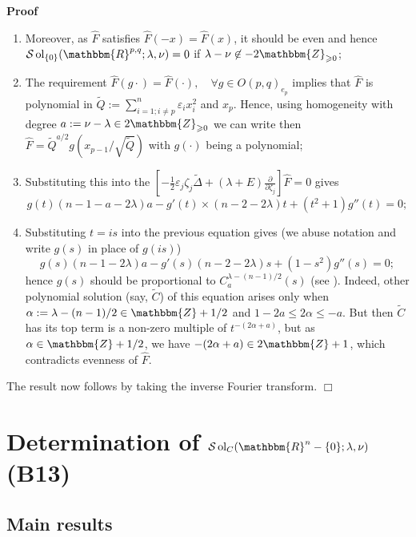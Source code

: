 \documentclass{article}
\newcommand{\assign}{:=}
\newcommand{\nin}{\not\in}
\newcommand{\tmop}[1]{\ensuremath{\operatorname{#1}}}
\renewenvironment{proof}{\noindent\textbf{Proof\ }}{\hspace*{\fill}$\Box$\medskip}
\theoremstyle{remark}
\begin{document}
\begin{proof}
\begin{enumerate}
    \item Moreover, as $\hat{F}$ satisfies $\hat{F} (- x) = \hat{F} (x)$, it
    should be even and hence $\mathcal{S} \tmop{ol}_{\{ 0 \}} (\mathbbm{R}^{p,
    q} ; \lambda, \nu) = 0$ if $\lambda - \nu \nin - 2\mathbbm{Z}_{\geqslant
    0}$;
    
    \item The requirement $\hat{F} (g \cdot) = \hat{F} (\cdot), \quad \forall
    g \in O (p, q)_{e_p}$ implies that $\hat{F}$ is polynomial in $\tilde{Q}
    \assign \sum_{i = 1 ; i \neq p}^n \varepsilon_i x_i^2$ and $x_p$. Hence,
    using homogeneity with degree $a \assign \nu - \lambda \in
    2\mathbbm{Z}_{\geqslant 0}$ we can write then $\hat{F} = \tilde{Q}^{a / 2}
    g \left( x_{p - 1} / \sqrt{\tilde{Q}} \right)$ with $g (\cdot)$ being a
    polynomial;
    
    \item Substituting this into the $\left[ - \frac{1}{2} \varepsilon_j
    \zeta_j \tilde{\Delta} + (\lambda + E) \frac{\partial}{\partial \zeta_j}
    \right] \hat{F} = 0$ gives
    \[ g (t) (n - 1 - a - 2 \lambda) a - g' (t) \times (n - 2 - 2 \lambda) t
       + (t^2 + 1) g'' (t) = 0 ; \]
    \item Substituting $t = i s$ into the previous equation gives (we abuse
    notation and write $g (s)$ in place of $g (i s)$)
    \[ g (s) (n - 1 - 2 \lambda) a - g' (s) (n - 2 - 2 \lambda) s + (1 - s^2)
       g'' (s) = 0 ; \]
    hence $g (s)$ should be proportional to $C^{\lambda - (n - 1) / 2}_a (s)$
    (see {\cite[thm. 11.4]{kobayashi2015differential2}}). Indeed, other
    polynomial solution (say, $\tilde{C}$) of this equation arises only when
    $\alpha \assign \lambda - (n - 1) / 2 \in \mathbbm{Z}+ 1 / 2$ and $1 - 2 a
    \leqslant 2 \alpha \leqslant - a$. But then $\tilde{C}$ has its top term
    is a non-zero multiple of $t^{- (2 \alpha + a)}$, but as $\alpha \in
    \mathbbm{Z}+ 1 / 2$, we have $- (2 \alpha + a) \in 2\mathbbm{Z}+ 1$, which
    contradicts evenness of $\hat{F}$.
  \end{enumerate}
  The result now follows by taking the inverse Fourier transform.
\end{proof}

\section{Determination of $\mathcal{S} \tmop{ol}_C (\mathbbm{R}^n - \{ 0 \} ;\lambda, \nu)$ (B13)}\label{sec:uniq-c}


\subsection{Main results}
\end{document}
